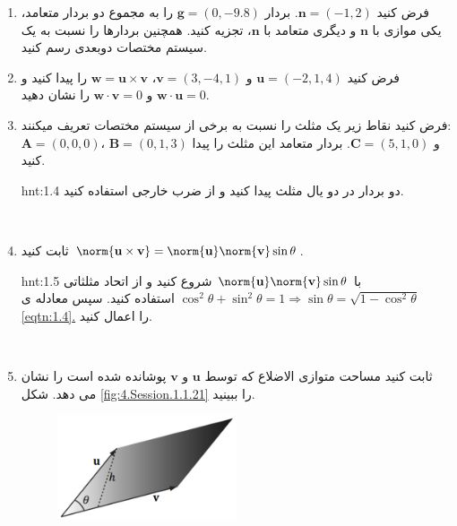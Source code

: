 {\begin{spacing}{1.5}
\begin{enumerate}[label=\textbf{\arabic*}.]
\begin{hint}{hnt:1.3}
            \end{hint}
            \\
            \item {فرض کنید $\textbf{n}=(-1,2)$. بردار $\textbf{g}=(0,-9.8)$ را به مجموع دو بردار متعامد، یکی موازی با $\textbf{n}$ و دیگری متعامد با $\textbf{n}$، تجزیه کنید. همچنین بردارها را نسبت به یک سیستم مختصات دوبعدی رسم کنید.}
            \\
            \item {فرض کنید $\textbf{u}=(-2,1,4)$ و $\textbf{v}=(3,-4,1)$، $\textbf{w}=\textbf{u}\times\textbf{v}$ را پیدا کنید و $\textbf{w}\cdot\textbf{u}=0$ و $\textbf{w}\cdot\textbf{v}=0$ را نشان دهید.}
            \\
            \item {فرض کنید نقاط زیر یک مثلث را نسبت به برخی از سیستم مختصات تعریف میکنند:\\
                $\textbf{A}=(0,0,0)$، $\textbf{B}=(0,1,3)$ و $\textbf{C}=(5,1,0)$. بردار متعامد این مثلث را پیدا کنید.}
            \begin{hint}{hnt:1.4}
                \Large
                دو بردار در دو یال مثلث پیدا کنید و از ضرب خارجی استفاده کنید.
            \end{hint}
            \\
            \item \label{question.1.14} {ثابت کنید $\norm{\textbf{u}\times\textbf{v}}=\norm{\textbf{u}}\norm{\textbf{v}}\sin\theta$.}
            \begin{hint}{hnt:1.5}
                \Large
                با $\norm{\textbf{u}}\norm{\textbf{v}}\sin\theta$ شروع کنید و از اتحاد مثلثاتی $\cos^2\theta+\sin^2\theta=1\Longrightarrow\sin\theta=\sqrt{\displaystyle 1-\cos^2\theta}$ استفاده کنید. سپس معادله ی \hyperref[eqtn:1.4]{\ref{eqtn:1.4}.} را اعمال کنید.
            \end{hint}
            \\
            \item {ثابت کنید  مساحت متوازی الاضلاع که توسط $\textbf{u}$ و $\textbf{v}$ پوشانده شده است را نشان می دهد. شکل \ref{fig:4.Session.1.1.21} را ببینید.}
            \begin{figure}[H]
                \centering
                \setlength{\belowcaptionskip}{-10pt}
                \includegraphics[width=0.5\textwidth]{Images/4/1/4.Session.1.1.21}

\end{figure}
\end{enumerate}
\end{spacing}}
